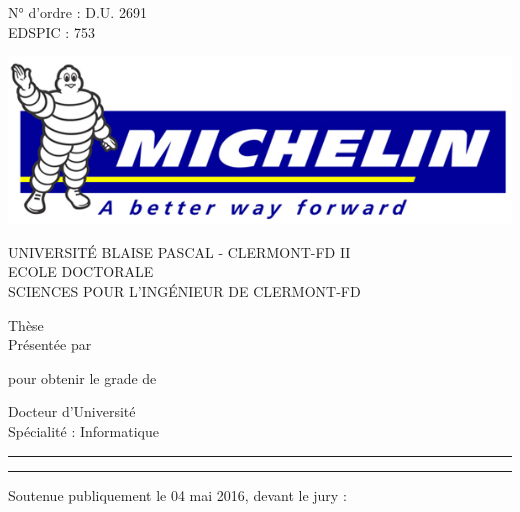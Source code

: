 %
\begin{titlepage}

    \begin{minipage}{0.3\textwidth}
        N° d'ordre : D.U. 2691\\
        EDSPIC : 753
    \end{minipage}
    \hfill
    \begin{minipage}{0.3\textwidth}
        \includegraphics[width=1.0\linewidth]{figures/michelin.jpg}
    \end{minipage}

	\center
    {\Large\uppercase{Universit\'e Blaise Pascal - Clermont-Fd II\\Ecole Doctorale\\Sciences pour l'Ing\'enieur de Clermont-Fd}\par}

    \hfill

    {\huge Thèse}\\
    Présentée par\\
    {\huge\thesisName\par}

    pour obtenir le grade de

    {\LARGE Docteur d'Université}\\
    Spécialité : Informatique\par

    \rule[5pt]{\textwidth}{.4pt}
    {\LARGE\thesisTitle \par}
    \rule[5pt]{\textwidth}{.4pt}\par

    \flushleft
    Soutenue publiquement le 04 mai 2016, devant le jury :


\end{titlepage}
